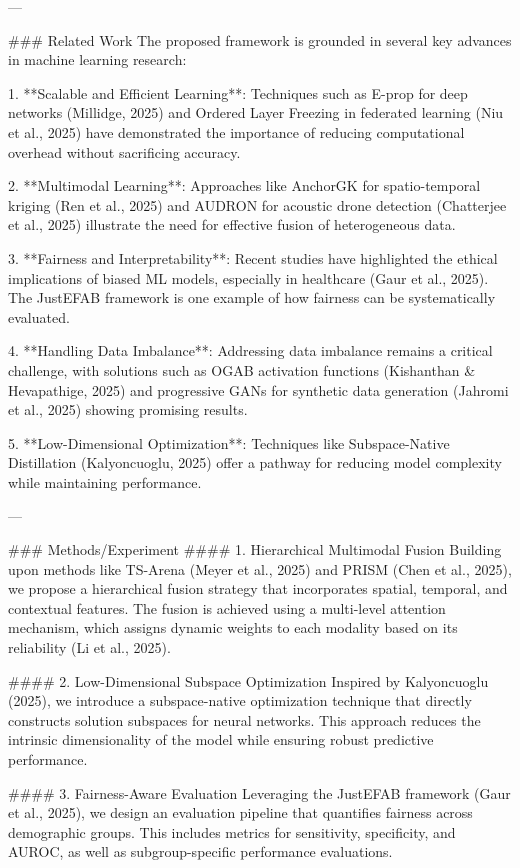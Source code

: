 ---

### Related Work
The proposed framework is grounded in several key advances in machine learning research:

1. **Scalable and Efficient Learning**: Techniques such as E-prop for deep networks (Millidge, 2025) and Ordered Layer Freezing in federated learning (Niu et al., 2025) have demonstrated the importance of reducing computational overhead without sacrificing accuracy. 
   
2. **Multimodal Learning**: Approaches like AnchorGK for spatio-temporal kriging (Ren et al., 2025) and AUDRON for acoustic drone detection (Chatterjee et al., 2025) illustrate the need for effective fusion of heterogeneous data.

3. **Fairness and Interpretability**: Recent studies have highlighted the ethical implications of biased ML models, especially in healthcare (Gaur et al., 2025). The JustEFAB framework is one example of how fairness can be systematically evaluated.

4. **Handling Data Imbalance**: Addressing data imbalance remains a critical challenge, with solutions such as OGAB activation functions (Kishanthan & Hevapathige, 2025) and progressive GANs for synthetic data generation (Jahromi et al., 2025) showing promising results.

5. **Low-Dimensional Optimization**: Techniques like Subspace-Native Distillation (Kalyoncuoglu, 2025) offer a pathway for reducing model complexity while maintaining performance.

---

### Methods/Experiment
#### 1. Hierarchical Multimodal Fusion
Building upon methods like TS-Arena (Meyer et al., 2025) and PRISM (Chen et al., 2025), we propose a hierarchical fusion strategy that incorporates spatial, temporal, and contextual features. The fusion is achieved using a multi-level attention mechanism, which assigns dynamic weights to each modality based on its reliability (Li et al., 2025).

#### 2. Low-Dimensional Subspace Optimization
Inspired by Kalyoncuoglu (2025), we introduce a subspace-native optimization technique that directly constructs solution subspaces for neural networks. This approach reduces the intrinsic dimensionality of the model while ensuring robust predictive performance.

#### 3. Fairness-Aware Evaluation
Leveraging the JustEFAB framework (Gaur et al., 2025), we design an evaluation pipeline that quantifies fairness across demographic groups. This includes metrics for sensitivity, specificity, and AUROC, as well as subgroup-specific performance evaluations.

